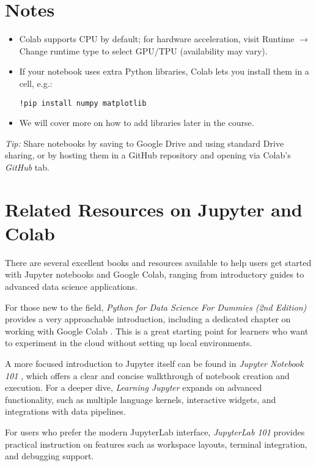\documentclass[11pt]{article}
\begin{document}
\section{Notes}
\begin{itemize}[leftmargin=*]
  \item Colab supports CPU by default; for hardware acceleration, visit Runtime $\rightarrow$ Change runtime type to select GPU/TPU (availability may vary).
  \item If your notebook uses extra Python libraries, Colab lets you install them in a cell, e.g.:
\begin{lstlisting}[style=cmd]
!pip install numpy matplotlib
\end{lstlisting}
  \item We will cover more on how to add libraries later in the course.
\end{itemize}

\bigskip
\noindent\textit{Tip:} Share notebooks by saving to Google Drive and using standard Drive sharing, or by hosting them in a GitHub repository and opening via Colab's \emph{GitHub} tab.

\section{Related Resources on Jupyter and Colab}

There are several excellent books and resources available to help users get started with
Jupyter notebooks and Google Colab, ranging from introductory guides to advanced data science
applications.

For those new to the field, \emph{Python for Data Science For Dummies (2nd Edition)} 
provides a very approachable introduction, including a dedicated chapter on 
working with Google Colab \cite{muller2019python}. This is a great starting point 
for learners who want to experiment in the cloud without setting up local environments.

A more focused introduction to Jupyter itself can be found in 
\emph{Jupyter Notebook 101} \cite{driscoll2018jupyter}, which offers a clear 
and concise walkthrough of notebook creation and execution. For a deeper dive, 
\emph{Learning Jupyter} \cite{huff2016learning} expands on advanced functionality, 
such as multiple language kernels, interactive widgets, and integrations with 
data pipelines.

For users who prefer the modern JupyterLab interface, \emph{JupyterLab 101} 
\cite{driscoll2020jupyterlab} provides practical instruction on features such as 
workspace layouts, terminal integration, and debugging support.
\end{document}
